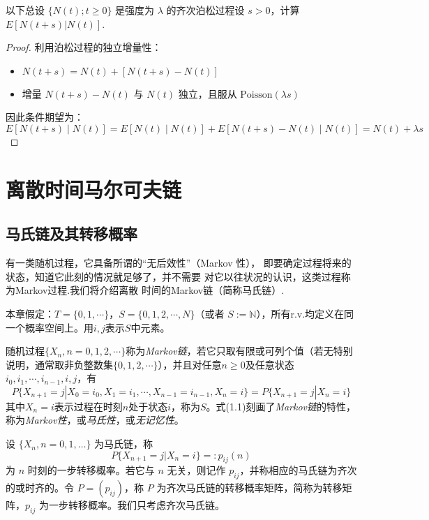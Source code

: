 \documentclass[lang=cn,10pt,thmcnt=section]{elegantbook}
\begin{document}
\begin{example}
	以下总设 $\{N(t); t \geq 0\}$ 是强度为 $\lambda$ 的齐次泊松过程设 $s > 0$，计算 $E[N(t+s) | N(t)]$.
\end{example}
\begin{proof}
	利用泊松过程的独立增量性：
\begin{itemize}
  \item $N(t+s) = N(t) + [N(t+s) - N(t)]$
  \item 增量 $N(t+s) - N(t)$ 与 $N(t)$ 独立，且服从 $\text{Poisson}(\lambda s)$
\end{itemize}

因此条件期望为：
\[
E[N(t+s) \mid N(t)] = E[N(t) \mid N(t)] + E[N(t+s) - N(t) \mid N(t)] = N(t) + \lambda s
\]
\end{proof}




\chapter{离散时间马尔可夫链}

\section{马氏链及其转移概率}
	有一类随机过程，它具备所谓的“无后效性”（Markov 性），
即要确定过程将来的状态，知道它此刻的情况就足够了，并不需要
对它以往状况的认识，这类过程称为Markov过程.我们将介绍离散
时间的Markov链（简称马氏链）.

本章假定：$T = \{0, 1, \cdots\}$，$S = \{0, 1, 2, \cdots, N\}$（或者 $S := \mathbb{N}$），所有r.v.均定义在同一个概率空间上。用$i, j$表示$S$中元素。
\begin{definition}[离散时间马尔可夫链]
	随机过程$\{X_n, n = 0, 1, 2, \cdots\}$称为\textit{Markov链}，若它只取有限或可列个值（若无特别说明，通常取非负整数集$\{0, 1, 2, \cdots\}$），并且对任意$n \geq 0$及任意状态$i_0, i_1, \cdots, i_{n-1}, i, j$，有
\begin{equation}
P\{X_{n+1} = j | X_0 = i_0, X_1 = i_1, \cdots, X_{n-1} = i_{n-1}, X_n = i\} = P\{X_{n+1} = j | X_n = i\}
\end{equation}
其中$X_n = i$表示过程在时刻$n$处于状态$i$，称为$S$。式(1.1)刻画了\textit{Markov链}的特性，称为\textit{Markov性}，或\textit{马氏性}，或\textit{无记忆性}。
\end{definition}

\begin{definition}[转移概率]
	设 $\{X_n, n = 0, 1, \ldots\}$ 为马氏链，称
\[ P\{X_{n+1} = j | X_n = i\} =: p_{ij}(n) \]
为 $n$ 时刻的一步转移概率。若它与 $n$ 无关，则记作 $p_{ij}$，并称相应的马氏链为齐次的或时齐的。令 $P = (p_{ij})$，称 $P$ 为齐次马氏链的转移概率矩阵，简称为转移矩阵，$p_{ij}$ 为一步转移概率。我们只考虑齐次马氏链。

\end{definition}
\end{document}
